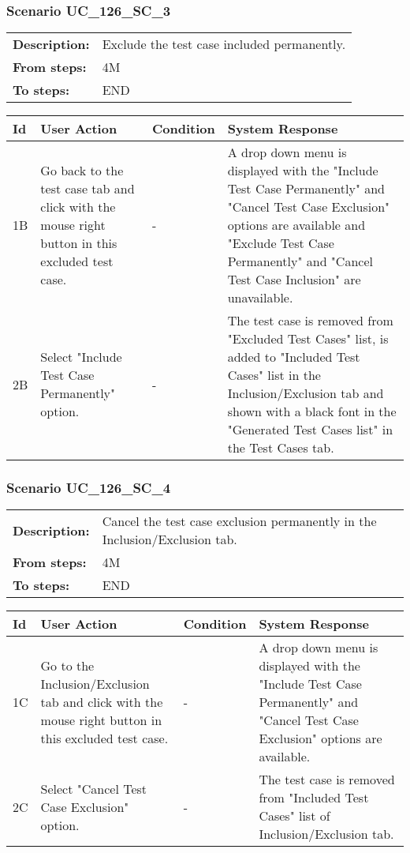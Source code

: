 \documentclass[a4paper,11pt]{article}
\newcommand{\bl}{\\ \hline}
\begin{document}
\subsubsection*{Scenario UC_126_SC_3}
\begin{tabular}{p{1in}p{4in}}
{\bf Description:} & Exclude the test case included permanently. \\
{\bf From steps:} & 4M \\
{\bf To steps:} & END \\
\end{tabular}
 
\begin{tabular}{|p{0.8in}|p{1.6in}|p{1.6in}|p{1.6in}|}
\hline
Id & User Action & Condition & System Response  \bl 
1B & Go back to the test case tab and click with the mouse right button in this excluded test case. & - & A drop down menu is displayed with the "Include Test Case Permanently" and "Cancel Test Case Exclusion" options are available and "Exclude Test Case Permanently" and "Cancel Test Case Inclusion" are unavailable. \bl 
2B & Select "Include Test Case Permanently" option. & - & The test case is removed from "Excluded Test Cases" list, is added to "Included Test Cases" list in the Inclusion/Exclusion tab and shown with a black font in the "Generated Test Cases list" in the Test Cases tab. \bl 
\end{tabular}
\subsubsection*{Scenario UC_126_SC_4}
\begin{tabular}{p{1in}p{4in}}
{\bf Description:} & Cancel the test case exclusion permanently in the Inclusion/Exclusion tab. \\
{\bf From steps:} & 4M \\
{\bf To steps:} & END \\
\end{tabular}
 
\begin{tabular}{|p{0.8in}|p{1.6in}|p{1.6in}|p{1.6in}|}
\hline
Id & User Action & Condition & System Response  \bl 
1C & Go to the Inclusion/Exclusion tab and click with the mouse right button in this excluded test case. & - & A drop down menu is displayed with the "Include Test Case Permanently" and "Cancel Test Case Exclusion" options are available. \bl 
2C & Select "Cancel Test Case Exclusion" option. & - & The test case is removed from "Included Test Cases" list of Inclusion/Exclusion tab. \bl 
\end{tabular}
\end{document}
